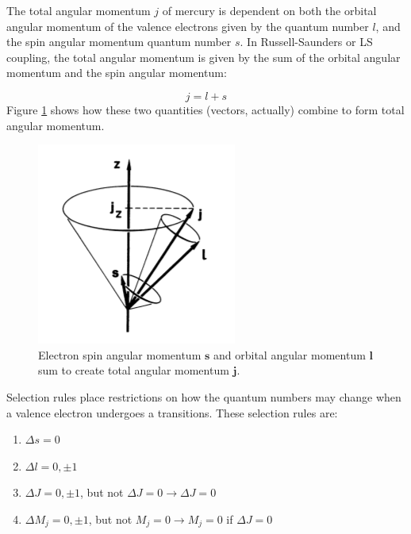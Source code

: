 \documentclass[twocolumn]{article}
\begin{document}
		The total angular momentum $j$ of mercury is dependent on both the orbital angular momentum of the valence electrons given by the quantum number $l$, and the spin angular momentum quantum number $s$.
		In Russell-Saunders or LS coupling, the total angular momentum is given by the sum of the orbital angular momentum and the spin angular momentum:
		
		\begin{equation}
			j = l + s
			\label{eq:TotalAngularP}
		\end{equation}
		Figure \ref{fig:TotalAngularMomentumDiagram} shows how these two quantities (vectors, actually) combine to form total angular momentum.
		
		\begin{figure}
			\centering
			\includegraphics[width=0.7\linewidth]{Images/TotalAngularMomentumDiagram}
			\caption{Electron spin angular momentum $\mathbf{s}$ and orbital angular momentum $\mathbf{l}$ sum to create total angular momentum $\mathbf{j}$.}
			\label{fig:TotalAngularMomentumDiagram}
		\end{figure}

		
		Selection rules place restrictions on how the quantum numbers may change when a valence electron undergoes a transitions.
		These selection rules are:
		\begin{enumerate}
			\item $\Delta s = 0$
			\item $\Delta l = 0, \pm1$
			\item $\Delta J = 0, \pm1$, but not $\Delta J = 0 \rightarrow \Delta J = 0$
			\item $\Delta M_j = 0, \pm1$, but not $M_j=0\rightarrow M_j=0$ if $\Delta J = 0$
		\end{enumerate}
		
\end{document}
